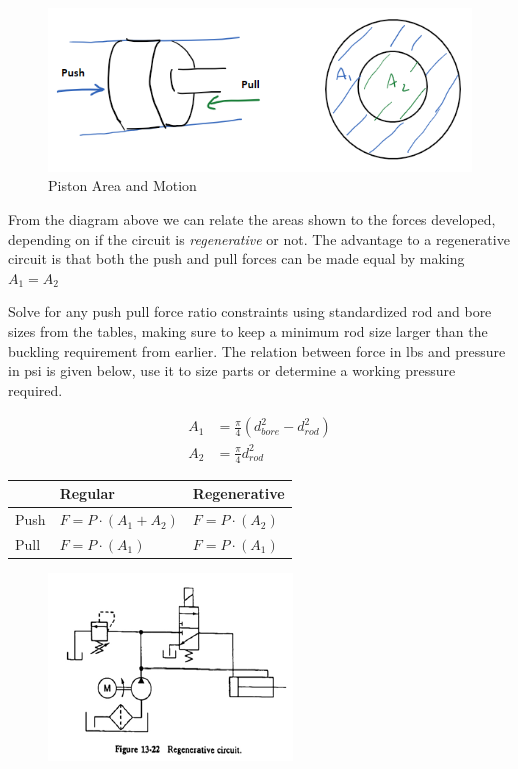 \documentclass[11pt, fleqn]{article}
\begin{document}
\begin{enumerate}
    \begin{figure}[!h]
        \centering
            \includegraphics[scale=.8]{Fluids/PistonArea.png}
        \caption{Piston Area and Motion}
        \label{fig:piston}
    \end{figure}

    From the diagram above we can relate the areas shown to the forces developed, depending on if the circuit is \textit{regenerative} or not.  The advantage to a regenerative circuit is that both the push and pull forces can be made equal by making $A_1=A_2$ 
   
Solve for any push pull force ratio constraints using standardized rod and bore sizes from the tables, making sure to keep a minimum rod size larger than the buckling requirement from earlier.  The relation between force in lbs and pressure in psi is given below, use it to size parts or determine a working pressure required.

    \begin{center}
    \begin{align*}
        A_1 &= \frac{\pi}{4}(d_{bore}^2-d_{rod}^2)\\
        A_2 &= \frac{\pi}{4}d_{rod}^2 
    \end{align*}        

\begin{tabular}{l|l|l|}
\cline{2-3}
                           & Regular          & Regenerative     \\ \hline
\multicolumn{1}{|l|}{Push} & $F = P\cdot(A_1+A_2)$ & $F = P\cdot(A_2)$     \\ \hline
\multicolumn{1}{|l|}{Pull} & $F = P\cdot(A_1)$     & $F = P\cdot(A_1)$ \\ \hline
\end{tabular}

        \begin{figure}[!h]
        \centering
            \includegraphics[scale=1.0]{Fluids/regenCircuit.png}
    \end{figure}
    \end{center}


\end{enumerate}
\end{document}
